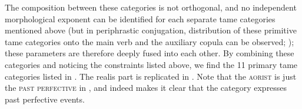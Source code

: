 \documentclass[a4paper, oneside, 12pt]{report}
\newcommand*{\citetable}[1]{Table~{#1}}
\newcommand*{\citepage}[1]{p.~{#1}}
\newcommand{\category}[1]{\textsc{#1}}
\begin{document}
The composition between these categories is not orthogonal, 
and no independent morphological exponent can be identified for 
each separate \acs{tame} categories mentioned above
(but in periphrastic conjugation, 
distribution of these primitive \acs{tame} categories 
onto the main verb and the auxiliary copula 
can be observed; \citealt[\citepage{1089}, (7)]{jacques2021grammar});
these parameters are therefore deeply fused into each other.
By combining these categories and noticing the constraints listed above, 
we find the 11 primary \acs{tame} categories 
listed in \citet[\citepage{21.1}]{jacques2021grammar}.
The realis part is replicated in .
Note that the \category{aorist} is just the \category{past perfective} in
\citet[\citetable{31.4}]{jacques2015sketch}, 
and indeed \citet[\citepage{1135}]{jacques2021grammar}
makes it clear that the category expresses past perfective events.
 
\end{document}
